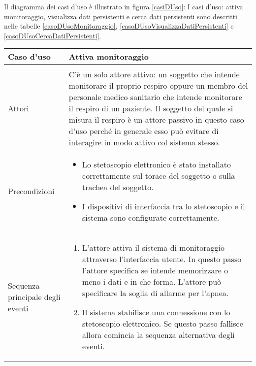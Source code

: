 Il diagramma dei casi d'uso \`e illustrato in figura \ref{casiDUso}:
I casi d'uso: attiva monitoraggio, visualizza dati persistenti e cerca dati persistenti sono descritti nelle tabelle \ref{casoDUsoMonitoraggio}, \ref{casoDUsoVisualizzaDatiPersistenti} e \ref{casoDUsoCercaDatiPersistenti}. 

   \begin{table}
  \centering
  \begin{tabular}{p{} p{}}
  \\
  \hline
      Caso d'uso 
    & 
      Attiva monitoraggio
  \\\hline\\
      Attori
    &
      C'\`e un solo attore attivo: un soggetto che intende monitorare il proprio respiro oppure un membro del personale medico sanitario che intende monitorare il respiro di un paziente. Il soggetto del quale si misura il respiro \`e un attore passivo in questo caso d'uso perch\'e in generale esso pu\`o evitare di interagire in modo attivo col sistema stesso. 
  \\
      Precondizioni
    &
      \begin{itemize}
	\item 
	  Lo stetoscopio elettronico \`e stato installato correttamente sul torace del soggetto o sulla trachea del soggetto.
	\item
	  I dispositivi di interfaccia tra lo stetoscopio e il sistema sono configurate correttamente.
      \end{itemize}
  \\
      Sequenza principale degli eventi
    &
      \begin{enumerate}
	\item 
	  L'attore attiva il sistema di monitoraggio attraverso l'interfaccia utente. 
	  In questo passo l'attore specifica se intende memorizzare o meno i dati e in che forma.
	  L'attore pu\`o specificare la soglia di allarme per l'apnea.
	\item
	  Il sistema stabilisce una connessione con lo stetoscopio elettronico. 
	  Se questo passo fallisce allora comincia la sequenza alternativa degli eventi.

\end{enumerate}
\end{tabular}
\end{table}
